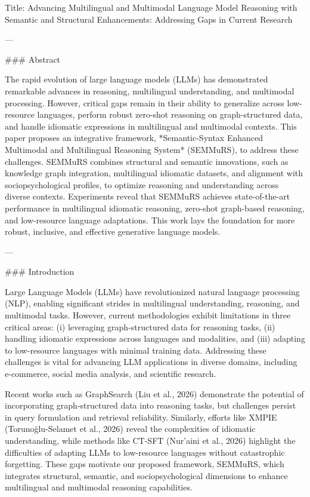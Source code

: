Title: Advancing Multilingual and Multimodal Language Model Reasoning with Semantic and Structural Enhancements: Addressing Gaps in Current Research

---

### Abstract

The rapid evolution of large language models (LLMs) has demonstrated remarkable advances in reasoning, multilingual understanding, and multimodal processing. However, critical gaps remain in their ability to generalize across low-resource languages, perform robust zero-shot reasoning on graph-structured data, and handle idiomatic expressions in multilingual and multimodal contexts. This paper proposes an integrative framework, *Semantic-Syntax Enhanced Multimodal and Multilingual Reasoning System* (SEMMuRS), to address these challenges. SEMMuRS combines structural and semantic innovations, such as knowledge graph integration, multilingual idiomatic datasets, and alignment with sociopsychological profiles, to optimize reasoning and understanding across diverse contexts. Experiments reveal that SEMMuRS achieves state-of-the-art performance in multilingual idiomatic reasoning, zero-shot graph-based reasoning, and low-resource language adaptations. This work lays the foundation for more robust, inclusive, and effective generative language models.

---

### Introduction

Large Language Models (LLMs) have revolutionized natural language processing (NLP), enabling significant strides in multilingual understanding, reasoning, and multimodal tasks. However, current methodologies exhibit limitations in three critical areas: (i) leveraging graph-structured data for reasoning tasks, (ii) handling idiomatic expressions across languages and modalities, and (iii) adapting to low-resource languages with minimal training data. Addressing these challenges is vital for advancing LLM applications in diverse domains, including e-commerce, social media analysis, and scientific research.

Recent works such as GraphSearch (Liu et al., 2026) demonstrate the potential of incorporating graph-structured data into reasoning tasks, but challenges persist in query formulation and retrieval reliability. Similarly, efforts like XMPIE (Torunoğlu-Selamet et al., 2026) reveal the complexities of idiomatic understanding, while methods like CT-SFT (Nur’aini et al., 2026) highlight the difficulties of adapting LLMs to low-resource languages without catastrophic forgetting. These gaps motivate our proposed framework, SEMMuRS, which integrates structural, semantic, and sociopsychological dimensions to enhance multilingual and multimodal reasoning capabilities.


